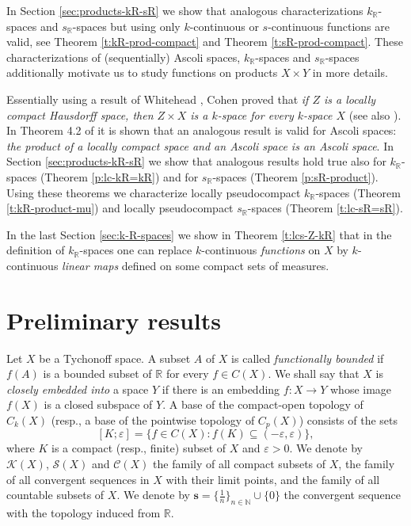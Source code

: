\documentclass[preprint,11pt]{elsarticle}
\numberwithin{equation}{section}
\numberwithin{theorem}{section}
\newcommand{\e}{\varepsilon}
\newcommand{\NN}{\mathbb{N}}
\newcommand{\IR}{\mathbb{R}}
\newcommand{\KK}{\mathcal{K}}
\newcommand{\CC}{C_k}
\begin{document}
In Section \ref{sec:products-kR-sR} we show that analogous characterizations $k_\IR$-spaces and $s_\IR$-spaces but using only $k$-continuous or $s$-continuous functions are valid, see Theorem \ref{t:kR-prod-compact} and Theorem \ref{t:sR-prod-compact}. These characterizations of (sequentially) Ascoli spaces, $k_\IR$-spaces and $s_\IR$-spaces additionally motivate us to study functions on products $X \times Y$ in more details.

Essentially using a result of Whitehead \cite[Lemma~4]{Whitehead}, Cohen proved that {\em if $Z$ is a locally compact Hausdorff space, then $Z\times X$ is a $k$-space for every $k$-space $X$} (see also \cite[3.3.17]{Eng}). In Theorem 4.2 of \cite{Gabr-seq-Ascoli} it is shown that an analogous result is valid for Ascoli spaces: {\em the product of a locally compact space and an Ascoli space is an Ascoli space}. In Section \ref{sec:products-kR-sR} we show that analogous results hold true also for $k_\IR$-spaces (Theorem \ref{p:lc-kR=kR}) and for $s_\IR$-spaces (Theorem \ref{p:sR-product}). Using these theorems we characterize locally pseudocompact $k_\IR$-spaces (Theorem \ref{t:kR-product-mu}) and  locally pseudocompact $s_\IR$-spaces (Theorem \ref{t:lc-sR=sR}).

In the last Section \ref{sec:k-R-spaces} we show in Theorem \ref{t:lcs-Z-kR} that in the definition of $k_\IR$-spaces one can replace $k$-continuous {\em functions} on $X$  by $k$-continuous {\em linear maps} defined on some compact sets of measures.


\section{Preliminary results} \label{sec:preliminary}


Let $X$ be a Tychonoff space. A subset $A$ of $X$ is called {\em functionally bounded} if $f(A)$ is a bounded subset of $\IR$ for every $f\in C(X)$. We shall say that $X$ is {\em closely embedded into } a space $Y$ if there is an embedding $f:X\to Y$ whose image $f(X)$ is a closed subspace of $Y$. A base of the compact-open topology of $\CC(X)$ (resp., a base of the pointwise topology of $C_p(X)$) consists of the sets
\[
[K;\e]=\big\{f\in C(X):f(K)\subseteq (-\e,\e)\big\},
\]
where $K$ is a compact (resp., finite) subset of $X$ and $\e>0$. We denote by $\KK(X)$, $\mathcal{S}(X)$ and $\mathcal{C}(X)$ the family of all compact subsets of $X$, the family of all convergent sequences in $X$ with their limit points, and the family of all countable subsets of $X$.
We denote by $\mathbf{s}=\{\tfrac{1}{n}\}_{n\in\NN}\cup\{0\}$ the convergent sequence with the topology induced from $\IR$.
\end{document}
